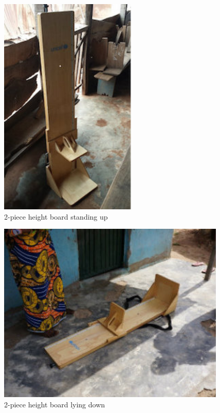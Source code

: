 \documentclass[
  12pt,
]{book}
\begin{document}
\begin{figure}

{\centering \includegraphics[width=2.57in]{images/heightBoard01} 

}

\caption{2-piece height board standing up}\label{fig:height01}
\end{figure}

\begin{figure}

{\centering \includegraphics[width=4.29in]{images/heightBoard02} 

}

\caption{2-piece height board lying down}\label{fig:height02}
\end{figure}
\end{document}
